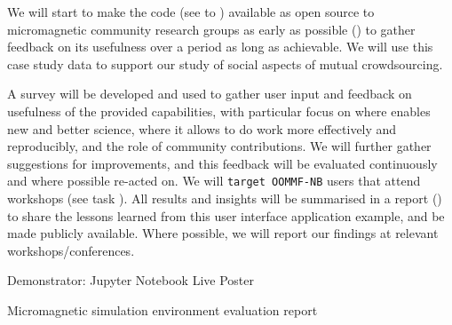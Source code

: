 \begin{workpackage}[id=social-aspects,wphases=0-48,
  title=Social Aspects,
  lead=UO,
  UORM=53,USHRM=8, USORM=5]
\begin{tasklist}
\begin{task}[title=OOMMF case study: Evaluation,lead=USO,PM=5]
  We will start to make the \OOMMFNB{} code (see
   to
  ) available as open
  source to micromagnetic community research groups as early as
  possible
  () to
  gather feedback on its usefulness over a period as long as
  achievable. We will use this case study data to support our study of
  social aspects of mutual crowdsourcing.

  A survey will be developed and used to gather user input and feedback on usefulness of
  the provided capabilities, with particular focus on where \OOMMFNB{} enables new and
  better science, where it allows to do work more effectively and reproducibly, and the
  role of community contributions. We will further gather suggestions for improvements,
  and this feedback will be evaluated continuously and where possible re-acted on. We will
  \texttt{target OOMMF-NB} users that attend workshops (see task
  ). All results and insights will be
  summarised in a report () to share the lessons
  learned from this user interface application example, and be made publicly
  available. Where possible, we will report our findings at relevant
  workshops/conferences.
\end{task}



\end{tasklist}


\begin{wpdelivs}
 \begin{wpdeliv}[due=36,id=social-poster,dissem=PU,nature=DEM]
   {Demonstrator: Jupyter Notebook Live Poster} 
\end{wpdeliv}
 \begin{wpdeliv}[due=48,id=oommf-nb-evaluation,dissem=PU,nature=R,lead=USO]
      {Micromagnetic simulation environment evaluation report}
\end{wpdeliv}
\end{wpdelivs}
\end{workpackage}


